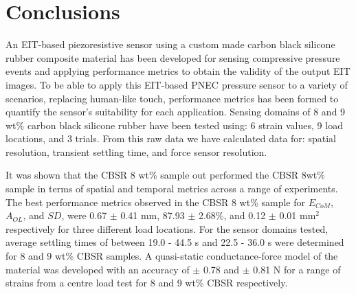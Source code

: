 \section{Conclusions}\label{sec:Summary and Conclusions}


An EIT-based piezoresistive sensor using a custom made carbon black silicone rubber composite material has been developed for sensing compressive pressure events and applying performance metrics to obtain the validity of the output EIT images. To be able to apply this EIT-based PNEC pressure sensor to a variety of scenarios, replacing human-like touch, performance metrics has been formed to quantify the sensor's suitability for each application. Sensing domains of 8 and 9 wt\% carbon black silicone rubber have been tested using: 6 strain values, 9 load locations, and 3 trials. From this raw data we have calculated data for: spatial resolution, transient settling time, and force sensor resolution. 

It was shown that the CBSR 8 wt\% sample out performed the CBSR 8wt\% sample in terms of spatial and temporal metrics across a range of experiments. The best performance metrics observed in the CBSR 8 wt\% sample for $E_{CoM}$, $A_{OL}$, and $S\!D$, were 0.67 $\pm$ 0.41 mm, 87.93 $\pm$ 2.68\%, and 0.12 $\pm$ 0.01 mm$^2$ respectively for three different load locations. For the sensor domains tested, average settling times of between 19.0 - 44.5 s and 22.5 - 36.0 s were determined for 8 and 9 wt\% CBSR samples. A quasi-static conductance-force model of the material was developed with an accuracy of  $\pm$ 0.78 and  $\pm$ 0.81 N for a range of strains from a centre load test for 8 and 9 wt\% CBSR respectively.

